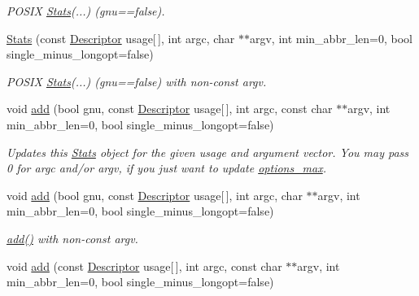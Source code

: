 \begin{DoxyCompactItemize}
\begin{DoxyCompactList}\small\item\em P\+O\+S\+IX \hyperlink{structoption_1_1Stats}{Stats}(...) (gnu==false). \end{DoxyCompactList}\item 
\hyperlink{structoption_1_1Stats_a9b8b4f275efaac6a509df75179929c70}{Stats} (const \hyperlink{structoption_1_1Descriptor}{Descriptor} usage\mbox{[}$\,$\mbox{]}, int argc, char $\ast$$\ast$argv, int min\+\_\+abbr\+\_\+len=0, bool single\+\_\+minus\+\_\+longopt=false)\hypertarget{structoption_1_1Stats_a9b8b4f275efaac6a509df75179929c70}{}\label{structoption_1_1Stats_a9b8b4f275efaac6a509df75179929c70}

\begin{DoxyCompactList}\small\item\em P\+O\+S\+IX \hyperlink{structoption_1_1Stats}{Stats}(...) (gnu==false) with non-\/const argv. \end{DoxyCompactList}\item 
void \hyperlink{structoption_1_1Stats_aa77e2a8b1704527d2d087820f4456143}{add} (bool gnu, const \hyperlink{structoption_1_1Descriptor}{Descriptor} usage\mbox{[}$\,$\mbox{]}, int argc, const char $\ast$$\ast$argv, int min\+\_\+abbr\+\_\+len=0, bool single\+\_\+minus\+\_\+longopt=false)
\begin{DoxyCompactList}\small\item\em Updates this \hyperlink{structoption_1_1Stats}{Stats} object for the given {\ttfamily usage} and argument vector. You may pass 0 for {\ttfamily argc} and/or {\ttfamily argv}, if you just want to update \hyperlink{structoption_1_1Stats_a8121787feb1c7db84fca3ccb012b0473}{options\+\_\+max}. \end{DoxyCompactList}\item 
void \hyperlink{structoption_1_1Stats_a2aa7bc64a85dcd9c59576f6a11c2b747}{add} (bool gnu, const \hyperlink{structoption_1_1Descriptor}{Descriptor} usage\mbox{[}$\,$\mbox{]}, int argc, char $\ast$$\ast$argv, int min\+\_\+abbr\+\_\+len=0, bool single\+\_\+minus\+\_\+longopt=false)\hypertarget{structoption_1_1Stats_a2aa7bc64a85dcd9c59576f6a11c2b747}{}\label{structoption_1_1Stats_a2aa7bc64a85dcd9c59576f6a11c2b747}

\begin{DoxyCompactList}\small\item\em \hyperlink{structoption_1_1Stats_aa77e2a8b1704527d2d087820f4456143}{add()} with non-\/const argv. \end{DoxyCompactList}\item 
void \hyperlink{structoption_1_1Stats_a4fc47be5db7f52016e3142a9b9dd0d1e}{add} (const \hyperlink{structoption_1_1Descriptor}{Descriptor} usage\mbox{[}$\,$\mbox{]}, int argc, const char $\ast$$\ast$argv, int min\+\_\+abbr\+\_\+len=0, bool single\+\_\+minus\+\_\+longopt=false)\hypertarget{structoption_1_1Stats_a4fc47be5db7f52016e3142a9b9dd0d1e}{}\label{structoption_1_1Stats_a4fc47be5db7f52016e3142a9b9dd0d1e}


\end{DoxyCompactItemize}
